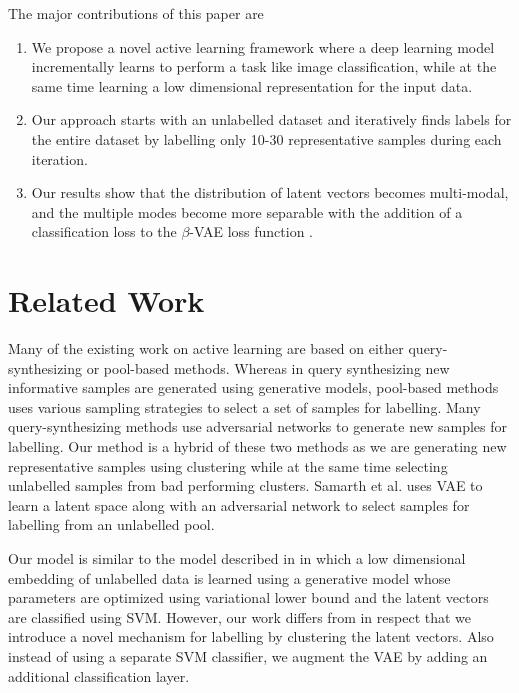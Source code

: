 \documentclass[runningheads]{llncs}
\begin{document}
The major contributions of this paper are
\begin{enumerate}
    \item We propose a novel active learning framework where a  deep learning model incrementally learns to perform a task like image classification, while at the same time learning a low dimensional representation for the input data.
    \item Our approach starts with an unlabelled dataset and iteratively finds labels for the entire dataset by labelling only 10-30 representative samples during each iteration.
    \item Our results show that the distribution of latent vectors becomes multi-modal, and the multiple modes become more separable with the addition of a classification loss to the $\beta$-VAE loss function \cite{beta_vae}.
\end{enumerate}

\section{Related Work}
Many of the existing work on active learning are based on either query-synthesizing or  pool-based methods.
Whereas in query synthesizing new informative samples are generated using generative models, pool-based methods \cite{wang_2016,beluch_2018} uses various sampling strategies to select a set of samples for labelling.
Many query-synthesizing methods use adversarial networks \cite{mahapatra_2018,mayer_2020} to generate new samples for labelling.
Our method is a hybrid of these two methods as we are generating new representative samples using clustering while at the same time selecting unlabelled samples from bad performing clusters.
Samarth et al. \cite{vaal} uses VAE to learn a latent space along with an adversarial network to select samples for labelling from an unlabelled pool.

Our model is similar to the model described in \cite{kingma_2014} in which a low dimensional embedding of unlabelled data is learned using a generative model whose parameters are optimized using variational lower bound and the latent vectors are classified using SVM.
However, our work differs from \cite{kingma_2014} in respect that we introduce a novel mechanism for labelling by clustering the latent vectors.
Also instead of using a separate SVM classifier, we augment the VAE by adding an additional classification layer.
\end{document}
